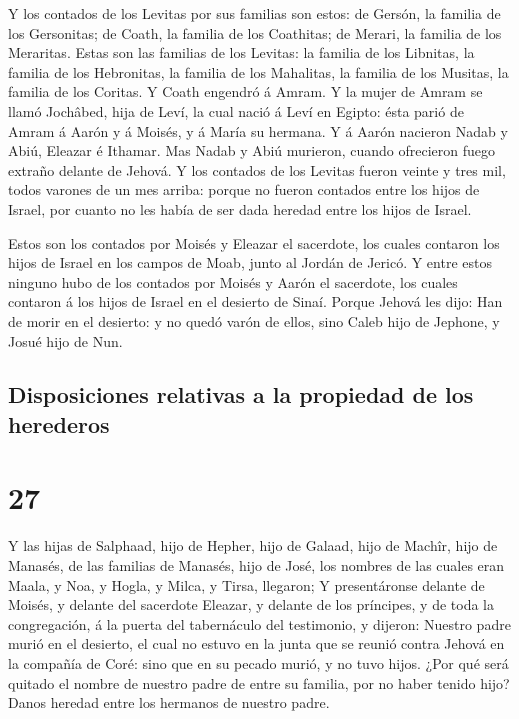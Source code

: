  Y los contados de los Levitas por sus familias son
estos: de Gersón, la familia de los Gersonitas; de Coath, la familia de
los Coathitas; de Merari, la familia de los Meraritas. 
Estas son las familias de los Levitas: la familia de los Libnitas, la
familia de los Hebronitas, la familia de los Mahalitas, la familia de
los Musitas, la familia de los Coritas. Y Coath engendró á Amram.
 Y la mujer de Amram se llamó Jochâbed, hija de Leví, la
cual nació á Leví en Egipto: ésta parió de Amram á Aarón y á Moisés, y á
María su hermana.  Y á Aarón nacieron Nadab y Abiú,
Eleazar é Ithamar.  Mas Nadab y Abiú murieron, cuando
ofrecieron fuego extraño delante de Jehová.  Y los
contados de los Levitas fueron veinte y tres mil, todos varones de un
mes arriba: porque no fueron contados entre los hijos de Israel, por
cuanto no les había de ser dada heredad entre los hijos de Israel.

 Estos son los contados por Moisés y Eleazar el
sacerdote, los cuales contaron los hijos de Israel en los campos de
Moab, junto al Jordán de Jericó.  Y entre estos ninguno
hubo de los contados por Moisés y Aarón el sacerdote, los cuales
contaron á los hijos de Israel en el desierto de Sinaí. 
Porque Jehová les dijo: Han de morir en el desierto: y no quedó varón de
ellos, sino Caleb hijo de Jephone, y Josué hijo de Nun.

\hypertarget{disposiciones-relativas-a-la-propiedad-de-los-herederos}{%
\subsection{Disposiciones relativas a la propiedad de los
herederos}\label{disposiciones-relativas-a-la-propiedad-de-los-herederos}}

\hypertarget{section-04-27}{%
\section{27}\label{section-04-27}}

 Y las hijas de Salphaad, hijo de Hepher, hijo de Galaad,
hijo de Machîr, hijo de Manasés, de las familias de Manasés, hijo de
José, los nombres de las cuales eran Maala, y Noa, y Hogla, y Milca, y
Tirsa, llegaron;  Y presentáronse delante de Moisés, y
delante del sacerdote Eleazar, y delante de los príncipes, y de toda la
congregación, á la puerta del tabernáculo del testimonio, y dijeron:
 Nuestro padre murió en el desierto, el cual no estuvo en
la junta que se reunió contra Jehová en la compañía de Coré: sino que en
su pecado murió, y no tuvo hijos.  ¿Por qué será quitado
el nombre de nuestro padre de entre su familia, por no haber tenido
hijo? Danos heredad entre los hermanos de nuestro padre.

